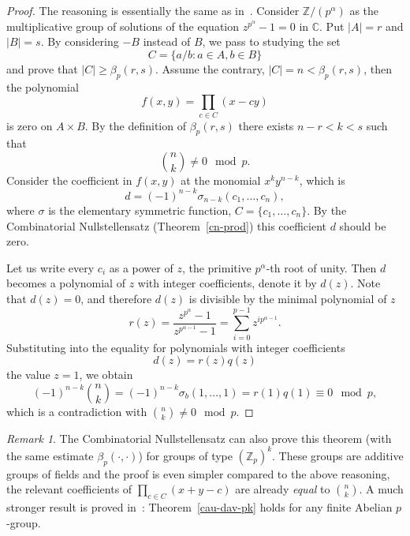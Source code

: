 \documentclass[12pt,a4paper]{amsart}
\theoremstyle{definition}
\theoremstyle{remark}
\newtheorem*{rem}{Remark}
\begin{document}
\begin{proof}
The reasoning is essentially the same as in~\cite[Theorem~3, Lemma~5]{kar2004}.
Consider $\mathbb Z/(p^\alpha)$ as the multiplicative group of solutions of the equation $z^{p^\alpha}-1=0$ in $\mathbb C$. Put $|A|=r$ and $|B|=s$. By considering $-B$ instead of $B$, we pass to studying the set 
$$
C = \{a/b : a\in A, b\in B\}
$$
and prove that $|C| \ge \beta_p(r, s)$. Assume the contrary, $|C| = n < \beta_p(r, s)$, then the polynomial
$$
f(x,y) = \prod_{c\in C} (x - cy)
$$
is zero on $A\times B$. By the definition of $\beta_p(r, s)$ there exists $n-r < k < s$ such that 
$$
\binom{n}{k} \neq 0\mod p.
$$
Consider the coefficient in $f(x, y)$ at the monomial $x^ky^{n-k}$, which is
$$
d = (-1)^{n-k} \sigma_{n-k}(c_1, \ldots, c_n),
$$
where $\sigma$ is the elementary symmetric function, $C=\{c_1,\ldots, c_n\}$. By the Combinatorial Nullstellensatz (Theorem~\ref{cn-prod}) this coefficient $d$ should be zero.

Let us write every $c_i$ as a power of $z$, the primitive $p^\alpha$-th root of unity. Then $d$ becomes a polynomial of $z$ with integer coefficients, denote it by $d(z)$. Note that $d(z)=0$, and therefore $d(z)$ is divisible by the minimal polynomial of $z$
$$
r(z) = \frac{z^{p^\alpha}-1}{z^{p^{\alpha-1}}-1} = \sum_{i=0}^{p-1} z^{ip^{\alpha-1}}.
$$ 
Substituting into the equality for polynomials with integer coefficients
$$
d(z) = r(z)q(z)
$$
the value $z=1$, we obtain
$$
(-1)^{n-k}\binom{n}{k} = (-1)^{n-k} \sigma_b(1, \ldots, 1) = r(1)q(1) \equiv 0 \mod p,
$$
which is a contradiction with $\binom{n}{k}\neq 0\mod p$.
\end{proof}

\begin{rem}
The Combinatorial Nullstellensatz can also prove this theorem (with the same estimate $\beta_p(\cdot, \cdot)$) for groups of type $(\mathbb Z_p)^k$. These groups are additive groups of fields and the proof is even simpler compared to the above reasoning, the relevant coefficients of $\prod_{c\in C} (x + y - c)$ are already \emph{equal} to $\binom{n}{k}$. A much stronger result is proved in~\cite{bole1996,ekp2003}: Theorem~\ref{cau-dav-pk} holds for any finite Abelian $p$-group.
\end{rem}
\end{document}
